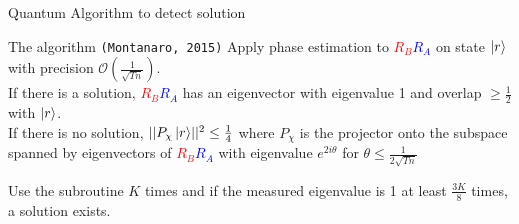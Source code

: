 \documentclass{beamer}
\begin{document}
\begin{frame}{Quantum Algorithm to detect solution}\pause
	\begin{block}{The algorithm \hfill {\small \texttt{(Montanaro, 2015)}}}
		Apply phase estimation to \textcolor{red}{$R_B$}\textcolor{blue}{$R_A$} on state $\ket{r}$ with precision $\mathcal{O}\left( \frac{1}{\sqrt{Tn}} \right)$. \pause \\
		If there is a solution, \textcolor{red}{$R_B$}\textcolor{blue}{$R_A$} has an eigenvector with eigenvalue 1 and overlap $\geq \frac{1}{2}$ with $\ket{r}$. \pause \\
		If there is no solution, $\lvert\lvert P_{\chi}\ket{r} \rvert\rvert^2 \leq \frac{1}{4}$ where $P_{\chi}$ is the projector onto the subspace spanned by eigenvectors of \textcolor{red}{$R_B$}\textcolor{blue}{$R_A$} with eigenvalue $e^{2i\theta}$ for $\theta \leq \frac{1}{2\sqrt{Tn}}$
	\end{block} \pause

Use the subroutine $K$ times and if the measured eigenvalue is 1 at least $\frac{3K}{8}$ times, a solution exists.
\end{frame}
\end{document}
